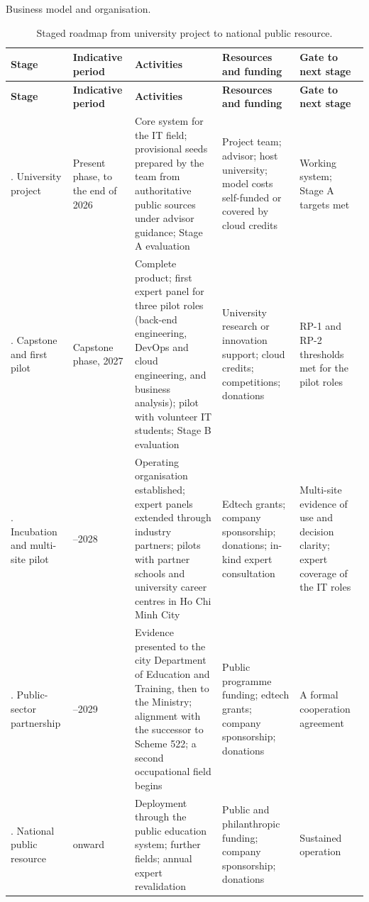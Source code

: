 Business model and organisation.

{\small{}\renewcommand{\arraystretch}{1.1}
\begin{longtable}{|>{\raggedright\arraybackslash}p{}|>{\raggedright\arraybackslash}p{}|>{\raggedright\arraybackslash}p{}|>{\raggedright\arraybackslash}p{}|>{\raggedright\arraybackslash}p{}|}
\caption{Staged roadmap from university project to national public resource.} \\
\hline
\textbf{Stage} & \textbf{Indicative period} & \textbf{Activities} & \textbf{Resources and funding} & \textbf{Gate to next stage} \\ \hline
\endfirsthead
\hline
\textbf{Stage} & \textbf{Indicative period} & \textbf{Activities} & \textbf{Resources and funding} & \textbf{Gate to next stage} \\ \hline
\endhead
0. University project & Present phase, to the end of 2026 & Core system for the IT field; provisional seeds prepared by the team from authoritative public sources under advisor guidance; Stage A evaluation & Project team; advisor; host university; model costs self-funded or covered by cloud credits & Working system; Stage A targets met \\ \hline
1. Capstone and first pilot & Capstone phase, 2027 & Complete product; first expert panel for three pilot roles (back-end engineering, DevOps and cloud engineering, and business analysis); pilot with volunteer IT students; Stage B evaluation & University research or innovation support; cloud credits; competitions; donations & RP-1 and RP-2 thresholds met for the pilot roles \\ \hline
2. Incubation and multi-site pilot & 2027--2028 & Operating organisation established; expert panels extended through industry partners; pilots with partner schools and university career centres in Ho Chi Minh City & Edtech grants; company sponsorship; donations; in-kind expert consultation & Multi-site evidence of use and decision clarity; expert coverage of the IT roles \\ \hline
3. Public-\allowbreak{}sector partnership & 2028--2029 & Evidence presented to the city Department of Education and Training, then to the Ministry; alignment with the successor to Scheme 522; a second occupational field begins & Public programme funding; edtech grants; company sponsorship; donations & A formal cooperation agreement \\ \hline
4. National public resource & 2030 onward & Deployment through the public education system; further fields; annual expert revalidation & Public and philanthropic funding; company sponsorship; donations & Sustained operation \\ \hline
\end{longtable}
}

